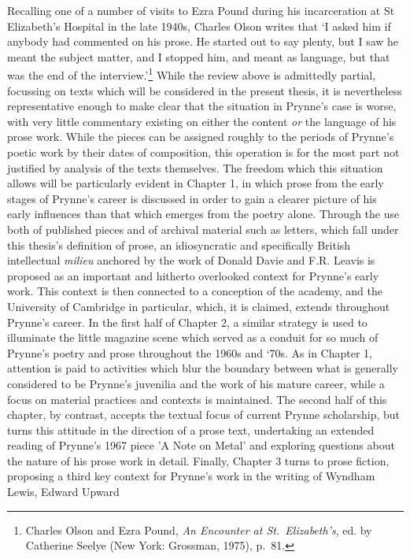 \documentclass[]{article}
\begin{document}
Recalling one of a number of visits to Ezra Pound during his
incarceration at St Elizabeth’s Hospital in the late 1940s, Charles
Olson writes that ‘I asked him if anybody had commented on his prose. He
started out to say plenty, but I saw he meant the subject matter, and I
stopped him, and meant as language, but that was the end of the
interview.’\footnote{Charles Olson and Ezra Pound, \emph{An Encounter at
  St.~Elizabeth’s}, ed. by Catherine Seelye (New York: Grossman, 1975),
  p.~81.} While the review above is admittedly partial, focussing on
texts which will be considered in the present thesis, it is nevertheless
representative enough to make clear that the situation in Prynne’s case
is worse, with very little commentary existing on either the content
\emph{or} the language of his prose work. While the pieces can be
assigned roughly to the periods of Prynne’s poetic work by their dates
of composition, this operation is for the most part not justified by
analysis of the texts themselves. The freedom which this situation
allows will be particularly evident in Chapter 1, in which prose from
the early stages of Prynne’s career is discussed in order to gain a
clearer picture of his early influences than that which emerges from the
poetry alone. Through the use both of published pieces and of archival
material such as letters, which fall under this thesis’s definition of
prose, an idiosyncratic and specifically British intellectual
\emph{milieu} anchored by the work of Donald Davie and F.R. Leavis is
proposed as an important and hitherto overlooked context for Prynne’s
early work. This context is then connected to a conception of the
academy, and the University of Cambridge in particular, which, it is
claimed, extends throughout Prynne’s career. In the first half of
Chapter 2, a similar strategy is used to illuminate the little magazine
scene which served as a conduit for so much of Prynne’s poetry and prose
throughout the 1960s and ‘70s. As in Chapter 1, attention is paid to
activities which blur the boundary between what is generally considered
to be Prynne’s juvenilia and the work of his mature career, while a
focus on material practices and contexts is maintained. The second half
of this chapter, by contrast, accepts the textual focus of current
Prynne scholarship, but turns this attitude in the direction of a prose
text, undertaking an extended reading of Prynne’s 1967 piece ’A Note on
Metal’ and exploring questions about the nature of his prose work in
detail. Finally, Chapter 3 turns to prose fiction, proposing a third key
context for Prynne’s work in the writing of Wyndham Lewis, Edward Upward
\end{document}
